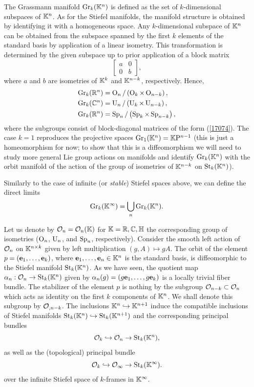 \begin{defn}
    The Grassmann manifold $\Gr_k(\bbK^n)$ is defined as the set of $k$-dimensional subspaces of $\bbK^n$. As for the Stiefel manifolds, the manifold structure is obtained by identifying it with a homogeneous space. Any $k$-dimensional subspace of $\bbK^n$ can be obtained from the subspace spanned by the first $k$ elements of the standard basis by application of a linear isometry. This transformation is determined by the given subspace up to prior application of a block matrix
    \[\begin{bmatrix}
        a&0\\0&b
    \end{bmatrix},\label{17074}\]
    where $a$ and $b$ are isometries of $\bbK^k$ and $\bbK^{n-k}$, respectively. Hence,
    \begin{align}
        \Gr_k(\bbR^n)&=\Or_n\slash \left(\Or_k\times\Or_{n-k}\right),\\
        \Gr_k(\bbC^n)&=\U_n\slash \left(\U_k\times\U_{n-k}\right),\\
        \Gr_k(\bbR^n)&=\Sp_n\slash \left(\Sp_k\times\Sp_{n-k}\right),
    \end{align}
    where the subgroups consist of block-diagonal matrices of the form (\ref{17074}). The case $k=1$ reproduces the projective spaces $\Gr_1(\bbK^n)=\KP^{n-1}$ (this is just a homeomorphism for now; to show that this is a diffeomorphism we will need to study more general Lie group actions on manifolds and identify $\Gr_k(\bbK^n)$ with the orbit manifold of the action of the group of isometries of $\bbK^{n-k}$ on $\St_k(\bbK^n)$).
\end{defn}


\begin{defn}
    Similarly to the case of infinite (or \emph{stable}) Stiefel spaces above, we can define the direct limits
    \[\Gr_k(\bbK^\infty)=\bigcup_n \Gr_k(\bbK^n).\]
\end{defn}

Let us denote by $\calO_n=\calO_n(\bbK)$ for $\bbK=\bbR,\bbC,\bbH$ the corresponding group of isometries ($\Or_n$, $\U_n$, and $\Sp_n$, respectively). Consider the smooth left action of $\calO_n$ on $\bbK^{n\times k}$ given by left multiplication $(g,A)\mapsto gA$. The orbit of the element $p=(\bf{e}_1,\ldots,\bf{e}_k)$, where $\bf{e}_1,\ldots,\bf{e}_n\in\bbK^n$ is the standard basis, is diffeomorphic to the Stiefel manifold $\St_k(\bbK^n)$. As we have seen, the quotient map $\alpha_n:\calO_n\to \St_k(\bbK^n)$ given by $\alpha_n(g)=(g\bf{e}_1,\ldots,g\bf{e}_k)$ is a locally trivial fiber bundle. The stabilizer of the element $p$ is nothing by the subgroup $\calO_{n-k}\subset \calO_n$ which acts as identity on the first $k$ components of $\bbK^n$. We shall denote this subgroup by $\calO_{,n-k}$. The inclusions $\bbK^n\hookrightarrow \bbK^{n+1}$ induce the compatible inclusions  of Stiefel manifolds $\St_k(\bbK^n)\hookrightarrow \St_k(\bbK^{n+1})$ and the corresponding principal bundles
\[\calO_k\hookrightarrow \calO_n\to \St_k(\bbK^n),\]
as well as the (topological) principal bundle
\[\calO_k\hookrightarrow \calO_\infty\to \St_k(\bbK^\infty).\]
over the infinite Stiefel space of $k$-frames in $\bbK^\infty$.

